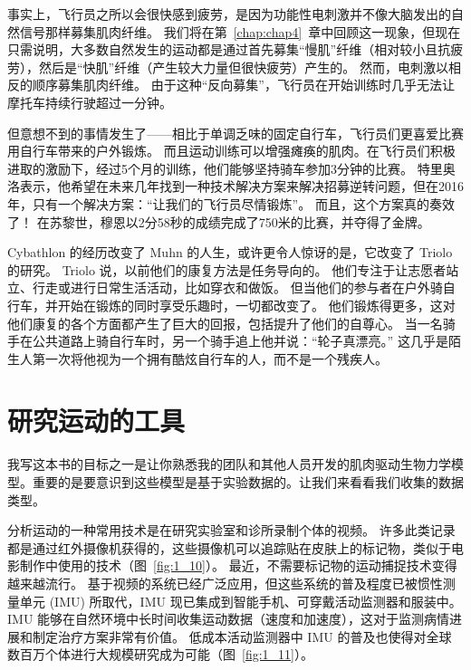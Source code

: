 事实上，飞行员之所以会很快感到疲劳，是因为功能性电刺激并不像大脑发出的自然信号那样募集肌肉纤维。
我们将在第~\ref{chap:chap4}~章中回顾这一现象，但现在只需说明，大多数自然发生的运动都是通过首先募集“慢肌”纤维（相对较小且抗疲劳），然后是“快肌”纤维（产生较大力量但很快疲劳）产生的。
然而，电刺激以相反的顺序募集肌肉纤维。
由于这种“反向募集”，飞行员在开始训练时几乎无法让摩托车持续行驶超过一分钟。



但意想不到的事情发生了——相比于单调乏味的固定自行车，飞行员们更喜爱比赛用自行车带来的户外锻炼。
而且运动训练可以增强瘫痪的肌肉。在飞行员们积极进取的激励下，经过5个月的训练，他们能够坚持骑车参加3分钟的比赛。
特里奥洛表示，他希望在未来几年找到一种技术解决方案来解决招募逆转问题，但在2016年，只有一个解决方案：“让我们的飞行员尽情锻炼”。
而且，这个方案真的奏效了！
在苏黎世，穆恩以2分58秒的成绩完成了750米的比赛，并夺得了金牌。


Cybathlon 的经历改变了 Muhn 的人生，或许更令人惊讶的是，它改变了 Triolo 的研究。
Triolo 说，以前他们的康复方法是任务导向的。
他们专注于让志愿者站立、行走或进行日常生活活动，比如穿衣和做饭。
但当他们的参与者在户外骑自行车，并开始在锻炼的同时享受乐趣时，一切都改变了。
他们锻炼得更多，这对他们康复的各个方面都产生了巨大的回报，包括提升了他们的自尊心。
当一名骑手在公共道路上骑自行车时，另一个骑手追上他并说：“轮子真漂亮。”
这几乎是陌生人第一次将他视为一个拥有酷炫自行车的人，而不是一个残疾人。



\section{研究运动的工具}

我写这本书的目标之一是让你熟悉我的团队和其他人员开发的肌肉驱动生物力学模型。重要的是要意识到这些模型是基于实验数据的。让我们来看看我们收集的数据类型。



分析运动的一种常用技术是在研究实验室和诊所录制个体的视频。
许多此类记录都是通过红外摄像机获得的，这些摄像机可以追踪贴在皮肤上的标记物，类似于电影制作中使用的技术（图~\ref{fig:1_10}）。
最近，不需要标记物的运动捕捉技术变得越来越流行。
基于视频的系统已经广泛应用，但这些系统的普及程度已被惯性测量单元 (IMU) 所取代，IMU 现已集成到智能手机、可穿戴活动监测器和服装中。
IMU 能够在自然环境中长时间收集运动数据（速度和加速度），这对于监测病情进展和制定治疗方案非常有价值。
低成本活动监测器中 IMU 的普及也使得对全球数百万个体进行大规模研究成为可能（图~\ref{fig:1_11}）。


